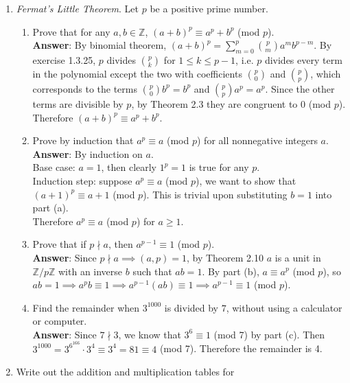 \documentclass{article}
\begin{document}
\begin{enumerate}
\begin{enumerate}
            \end{enumerate}
      \item \textit{Fermat's Little Theorem}. Let $p$ be a positive prime number.
            \begin{enumerate}
                  \item Prove that for any $a,b\in\mathbb{Z}$, $(a+b)^p\equiv a^p+b^p$ (mod $p$).\\
                        \textbf{Answer}: By binomial theorem, $(a+b)^p=\sum_{m=0}^p\binom{p}{m}a^mb^{p-m}$. By exercise 1.3.25, $p$ divides $\binom{p}{k}$ for $1\leq k\leq p-1$, i.e. $p$ divides every term in the polynomial except the two with coefficients $\binom{p}{0}$ and $\binom{p}{p}$, which corresponds to the terms $\binom{p}{0}b^p=b^p$ and $\binom{p}{p}a^p=a^p$. Since the other terms are divisible by $p$, by Theorem 2.3 they are congruent to 0 (mod $p$). Therefore $(a+b)^p\equiv a^p+b^p$.
                  \item Prove by induction that $a^p\equiv a$ (mod $p$) for all nonnegative integers $a$.\\
                        \textbf{Answer}: By induction on $a$.\\
                        Base case: $a=1$, then clearly $1^p=1$ is true for any $p$.\\
                        Induction step: suppose $a^p\equiv a$ (mod $p$), we want to show that $(a+1)^p\equiv a+1$ (mod $p$). This is trivial upon substituting $b=1$ into part (a).\\
                        Therefore $a^p\equiv a$ (mod $p$) for $a\geq 1$.
                  \item Prove that if $p\nmid a$, then $a^{p-1}\equiv 1$ (mod $p$).\\
                        \textbf{Answer}: Since $p\nmid a\implies (a,p)=1$, by Theorem 2.10 $a$ is a unit in $\mathbb{Z}/p\mathbb{Z}$ with an inverse $b$ such that $ab=1$. By part (b), $a\equiv a^p$ (mod $p$), so $ab=1\implies a^pb\equiv 1\implies a^{p-1}(ab)\equiv 1\implies a^{p-1}\equiv 1$ (mod $p$).
                  \item Find the remainder when $3^{1000}$ is divided by $7$, without using a calculator or computer.\\
                        \textbf{Answer}: Since $7\nmid 3$, we know that $3^6\equiv 1$ (mod 7) by part (c). Then $3^{1000}=3^{6^{166}}\cdot 3^4\equiv 3^4=81\equiv 4$ (mod 7). Therefore the remainder is 4.
            \end{enumerate}
      \item Write out the addition and multiplication tables for

\end{enumerate}
\end{document}

